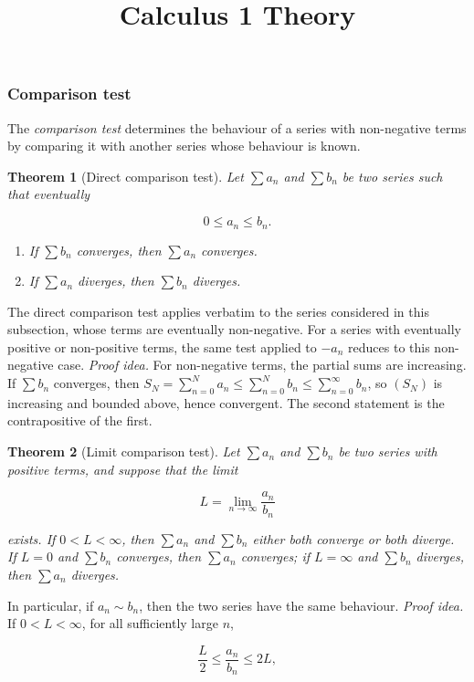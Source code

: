 \documentclass[11pt,a4paper]{article} \usepackage[T1]{fontenc}
\theoremstyle{plain} \newtheorem{theorem}{Theorem} \title{Calculus 1 Theory}
\begin{document}
\subsubsection {Comparison test}

The \emph{comparison test} determines the behaviour of a series with
non-negative terms by comparing it with another series whose behaviour is
known.

\begin{theorem}
[Direct comparison test] Let $\sum a_n$ and $\sum b_n$ be two series such that
eventually

\[
0 \le a_n \le b_n.
\]

\begin{enumerate}
\item If $\sum b_n$ converges, then $\sum a_n$ converges. \item If $\sum a_n$
diverges, then $\sum b_n$ diverges.
\end{enumerate}

\end{theorem}

The direct comparison test applies verbatim to the series considered in this
subsection, whose terms are eventually non-negative. For a series with
eventually positive or non-positive terms, the same test applied to $-a_n$
reduces to this non-negative case. \emph{Proof idea.} For non-negative terms,
the partial sums are increasing. If $\sum b_n$ converges, then $S_N =
\sum_{n=0}^{N} a_n \le \sum_{n=0}^{N} b_n \le \sum_{n=0}^{\infty} b_n$, so
$(S_N)$ is increasing and bounded above, hence convergent. The second statement
is the contrapositive of the first.

\begin{theorem}
[Limit comparison test] Let $\sum a_n$ and $\sum b_n$ be two series with
positive terms, and suppose that the limit

\[
L = \lim_{n\to\infty} \frac{a_n}{b_n}
\]

exists. If $0<L<\infty$, then $\sum a_n$ and $\sum b_n$ either both converge or
both diverge. If $L=0$ and $\sum b_n$ converges, then $\sum a_n$ converges; if
$L=\infty$ and $\sum b_n$ diverges, then $\sum a_n$ diverges.
\end{theorem}

In particular, if $a_n \sim b_n$, then the two series have the same behaviour.
\emph{Proof idea.} If $0<L<\infty$, for all sufficiently large $n$,

\[
\frac{L}{2} \le \frac{a_n}{b_n} \le 2L,
\]
\end{document}
